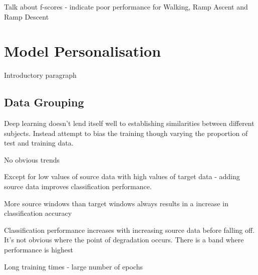 Talk about f-scores - indicate poor performance for Walking, Ramp Ascent and Ramp Descent



\section{Model Personalisation}
\label{sec:model-personalisation-results}
Introductory paragraph


\subsection{Data Grouping}
Deep learning doesn't lend itself well to establishing similarities between different subjects. Instead attempt to bias the training though varying the proportion of test and training data.



No obvious trends

Except for low values of source data with high values of target data - adding source data improves classification performance. 

More source windows than target windows always results in a increase in classification accuracy

Classification performance increases with increasing source data before falling off. It's not obvious where the point of degradation occurs. There is a band where performance is highest

Long training times - large number of epochs

